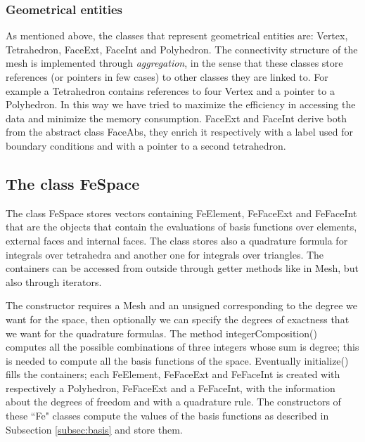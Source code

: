 \documentclass[12pt, a4paper]{article}
\newcommand{\code}[1]{{\footnotesize\ttfamily #1}}
\theoremstyle{definition}
\theoremstyle{plain}
\theoremstyle{plain}
\theoremstyle{definition}
\begin{document}
\subsubsection{Geometrical entities}
As mentioned above, the classes that represent geometrical entities are: \code{Vertex}, \code{Tetrahedron}, \code{FaceExt}, \code{FaceInt} and \code{Polyhedron}. The connectivity structure of the mesh is implemented through \emph{aggregation}, in the sense that these classes store references (or pointers in few cases) to other classes they are linked to. For example a \code{Tetrahedron} contains references to four \code{Vertex} and a pointer to a \code{Polyhedron}. In this way we have tried to maximize the efficiency in accessing the data and minimize the memory consumption. \code{FaceExt} and \code{FaceInt} derive both from the abstract class \code{FaceAbs}, they enrich it respectively with a label used for boundary conditions and with a pointer to a second tetrahedron.
\subsection{The class FeSpace}

The class \code{FeSpace} stores vectors containing \code{FeElement}, \code{FeFaceExt} and \code{FeFaceInt} that are the objects that contain the evaluations of basis functions over elements, external faces and internal faces. The class stores also a quadrature formula for integrals over tetrahedra and another one for integrals over triangles. The containers can be accessed from outside through getter methods like in \code{Mesh}, but also through iterators.

The constructor requires a \code{Mesh} and an \code{unsigned} corresponding to the degree we want for the space, then optionally we can specify the degrees of exactness that we want for the quadrature formulas. The method \code{integerComposition()} computes all the possible combinations of three integers whose sum is \code{degree}; this is needed to compute all the basis functions of the space. Eventually \code{initialize()} fills the containers; each \code{FeElement}, \code{FeFaceExt} and \code{FeFaceInt} is created with respectively a \code{Polyhedron}, \code{FeFaceExt} and a \code{FeFaceInt}, with the information about the degrees of freedom and with a quadrature rule. The constructors of these ``Fe" classes compute the values of the basis functions as described in Subsection \ref{subsec:basis} and store them.\\
\end{document}
